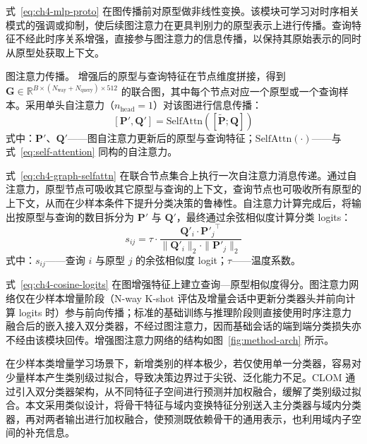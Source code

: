 式~\eqref{eq:ch4-mlp-proto} 在图传播前对原型做非线性变换。该模块可学习对时序相关模式的强调或抑制，使后续图注意力在更具判别力的原型表示上进行传播。查询特征不经此时序关系增强，直接参与图注意力的信息传播，以保持其原始表示的同时从原型处获取上下文。

图注意力传播。 增强后的原型与查询特征在节点维度拼接，得到 $\mathbf{G} \in \mathbb{R}^{B \times (N_{\mathrm{way}} + N_{\mathrm{query}}) \times 512}$ 的联合图，其中每个节点对应一个原型或一个查询样本。采用单头自注意力（$n_{\mathrm{head}}=1$）对该图进行信息传播：
\begin{equation}\label{eq:ch4-graph-selfattn}
  [\mathbf{P}', \mathbf{Q}'] = \mathrm{SelfAttn}\!\left([\tilde{\mathbf{P}}; \mathbf{Q}]\right)
\end{equation}
\noindent 式中：$\mathbf{P}'$、$\mathbf{Q}'$——图自注意力更新后的原型与查询特征；$\mathrm{SelfAttn}(\cdot)$——与式~\eqref{eq:self-attention} 同构的自注意力。

式~\eqref{eq:ch4-graph-selfattn} 在联合节点集合上执行一次自注意力消息传递。通过自注意力，原型节点可吸收其它原型与查询的上下文，查询节点也可吸收所有原型的上下文，从而在少样本条件下提升分类决策的鲁棒性。自注意力计算完成后，将输出按原型与查询的数目拆分为 $\mathbf{P}'$ 与 $\mathbf{Q}'$，最终通过余弦相似度计算分类 logits：
\begin{equation}\label{eq:ch4-cosine-logits}
  s_{ij} = \tau \cdot \frac{\mathbf{Q}'_i \cdot {\mathbf{P}'_j}^\top}{\|\mathbf{Q}'_i\|_2 \cdot \|\mathbf{P}'_j\|_2}
\end{equation}
\noindent 式中：$s_{ij}$——查询 $i$ 与原型 $j$ 的余弦相似度 logit；$\tau$——温度系数。

式~\eqref{eq:ch4-cosine-logits} 在图增强特征上建立查询—原型相似度得分。图注意力网络仅在少样本增量阶段（N-way K-shot 评估及增量会话中更新分类器头并前向计算 logits 时）参与前向传播；标准的基础训练与推理阶段则直接使用时序注意力融合后的嵌入接入双分类器，不经过图注意力，因而基础会话的端到端分类损失亦不经由该模块回传。增强图注意力网络的结构如图~\ref{fig:method-arch} 所示。


在少样本类增量学习场景下，新增类别的样本极少，若仅使用单一分类器，容易对少量样本产生类别级过拟合，导致决策边界过于尖锐、泛化能力不足。CLOM\cite{zou2022clom} 通过引入双分类器架构，从不同特征子空间进行预测并加权融合，缓解了类别级过拟合。本文采用类似设计，将骨干特征与域内变换特征分别送入主分类器与域内分类器，再对两者输出进行加权融合，使预测既依赖骨干的通用表示，也利用域内子空间的补充信息。

